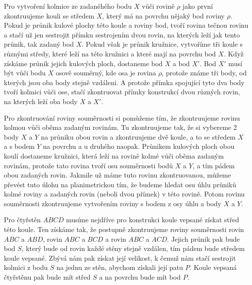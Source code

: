 \documentclass{fkssolpub}
\author{Ondřej Sedláček}
\begin{document}
 

Pro vytvoření kolmice ze zadanéhého bodu $X$ vůči rovině $\rho$ jako první zkontruujeme
kouli se středem $X$, který má na povrchu nějaký bod roviny $\rho$. Pokud je průnik
kulové plochy této koule a roviny bod, tvoří rovina tečnou rovinu a stačí už jen 
sestrojit přímku sestrojením dvou rovin, na kterých leží jak tento průnik, tak zadaný 
bod $X$. Pokud však je průnik kružnice, vytvoříme tři koule s různými středy, které leží
na této kružnici a které mají na povrchu bod $X$. Když získáme průnik jejich kulových
ploch, dostaneme bod $X$ a bod $X'$. Bod $X'$ musí být vůči bodu $X$ osově souměrný,
kde osa je rovina $\rho$, protože známe tři body, od kterých jsou oba body stejně
vzdáleni. A protože přímka spojující tyto dva body tvoří kolmici vůči ose, stačí
zkontruovat přímky konstrukcí dvou různých rovin, na kterých leží oba body $X$ a
$X'$.

Pro zkontruování roviny souměrnosti si pomůžeme tím, že zkontruujeme rovinu kolmou
vůči oběma zadaným rovinám. Tu zkontruujeme tak, že si vybereme 2 body $X$ a $Y$ na průniku
obou rovin a zkontruujeme dvě koule, a to se středem $X$ a s bodem $Y$ na povrchu a 
u druhého naopak. Průnikem kulových ploch obou koulí dostaneme kružnici, která leží
na rovině kolmé vůči oběma zadaným rovinám, protože tato rovina tvoří osu souměrnosti
bodů $X$ a $Y$, a tím pádem obou zadaných rovin. Jakmile už máme tuto rovinu
zkontruovanou, můžeme převést tuto úlohu na planimetrickou tím, že budeme hledat
osu úhlu průniků kolmé roviny a zadaných rovin (neboli dvou přímek) v této rovině.
Potom rovinu souměrnosti zkontruujeme vytvořením roviny s bodem z osy úhlu a 
body $X$ a $Y$.

Pro čtyřstěn $ABCD$ musíme nejdříve pro konstrukci koule vepsané získat střed této
koule. Ten získáme tak, že postupně zkontruujeme roviny souměrnosti rovin $ABC$ a
$ABD$, rovin $ABC$ a $BCD$ a rovin $ABC$ a $ACD$. Jejich průnik pak bude bod $S$, který
bude od rovin každé stěny stejně vzdálen, tím pádem bude středem koule vepsané. Zbývá
nám pak získat její velikost, k čemuž nám stačí sestrojit kolmici z bodu $S$ na jednu
ze stěn, abychom získali její patu $P$. Koule vepsaná čtyřstěnu pak bude mít střed $S$
a na povrchu bude mít bod $P$.
\end{document}
